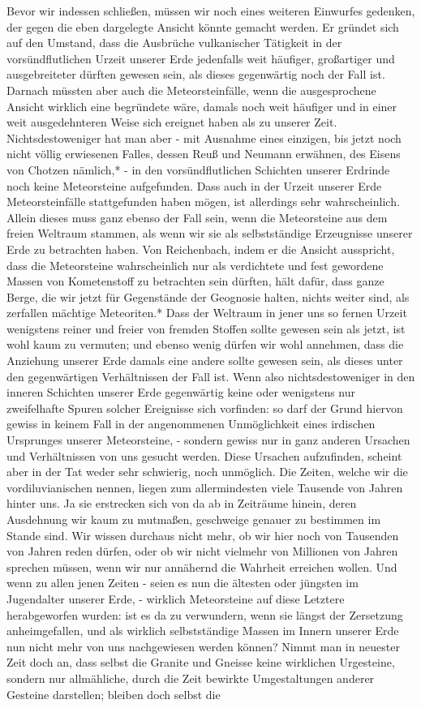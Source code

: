 \documentclass[a4paper, 8pt, oneside, polutonikogreek, german]{article}
\begin{document}
Bevor wir indessen schließen, müssen wir noch eines weiteren Einwurfes gedenken, der gegen die eben dargelegte Ansicht könnte gemacht werden. Er gründet sich auf den Umstand, dass die Ausbrüche vulkanischer Tätigkeit in der vorsündflutlichen Urzeit unserer Erde jedenfalls weit häufiger, großartiger und ausgebreiteter dürften gewesen sein, als dieses gegenwärtig noch der Fall ist. Darnach müssten aber auch die Meteorsteinfälle, wenn die ausgesprochene Ansicht wirklich eine begründete wäre, damals noch weit häufiger und in einer weit ausgedehnteren Weise sich ereignet haben als zu unserer Zeit. Nichtsdestoweniger hat man aber - mit Ausnahme eines einzigen, bis jetzt noch nicht völlig erwiesenen Falles, dessen Reuß und Neumann erwähnen, des Eisens von Chotzen nämlich,* - in den vorsündflutlichen Schichten unserer Erdrinde noch keine Meteorsteine aufgefunden. Dass auch in der Urzeit unserer Erde Meteorsteinfälle stattgefunden haben mögen, ist allerdings sehr wahrscheinlich. Allein dieses muss ganz ebenso der Fall sein, wenn die Meteorsteine aus dem freien Weltraum stammen, als wenn wir sie als selbstständige Erzeugnisse unserer Erde zu betrachten haben. Von Reichenbach, indem er die Ansicht ausspricht, dass die Meteorsteine wahrscheinlich nur als verdichtete und fest gewordene Massen von Kometenstoff zu betrachten sein dürften, hält dafür, dass ganze Berge, die wir jetzt für Gegenstände der Geognosie halten, nichts weiter sind, als zerfallen mächtige Meteoriten.* Dass der Weltraum in jener uns so fernen Urzeit wenigstens reiner und freier von fremden Stoffen sollte gewesen sein als jetzt, ist wohl kaum zu vermuten; und ebenso wenig dürfen wir wohl annehmen, dass die Anziehung unserer Erde damals eine andere sollte gewesen sein, als dieses unter den gegenwärtigen Verhältnissen der Fall ist. Wenn also nichtsdestoweniger in den inneren Schichten unserer Erde gegenwärtig keine oder wenigstens nur zweifelhafte Spuren solcher Ereignisse sich vorfinden: so darf der Grund hiervon gewiss in keinem Fall in der angenommenen Unmöglichkeit eines irdischen Ursprunges unserer Meteorsteine, - sondern gewiss nur in ganz anderen Ursachen und Verhältnissen von uns gesucht werden. Diese Ursachen aufzufinden, scheint aber in der Tat weder sehr schwierig, noch unmöglich. Die Zeiten, welche wir die vordiluvianischen nennen, liegen zum allermindesten viele Tausende von Jahren hinter uns. Ja sie erstrecken sich von da ab in Zeiträume hinein, deren Ausdehnung wir kaum zu mutmaßen, geschweige genauer zu bestimmen im Stande sind. Wir wissen durchaus nicht mehr, ob wir hier noch von Tausenden von Jahren reden dürfen, oder ob wir nicht vielmehr von Millionen von Jahren sprechen müssen, wenn wir nur annähernd die Wahrheit erreichen wollen. Und wenn zu allen jenen Zeiten - seien es nun die ältesten oder jüngsten im Jugendalter unserer Erde, - wirklich Meteorsteine auf diese Letztere herabgeworfen wurden: ist es da zu verwundern, wenn sie längst der Zersetzung anheimgefallen, und als wirklich selbstständige Massen im Innern unserer Erde nun nicht mehr von uns nachgewiesen werden können? Nimmt man in neuester Zeit doch an, dass selbst die Granite und Gneisse keine wirklichen Urgesteine, sondern nur allmähliche, durch die Zeit bewirkte Umgestaltungen anderer Gesteine darstellen; bleiben doch selbst die 
\end{document}
